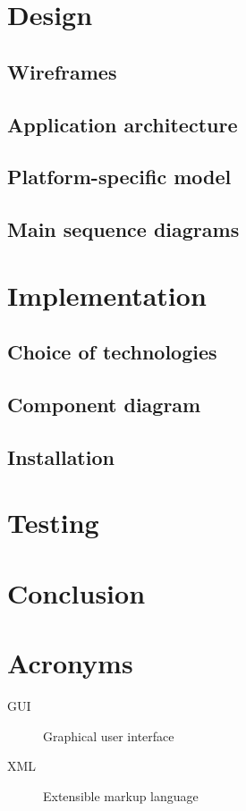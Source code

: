 \documentclass[thesis=B,english]{FITthesis}[2012/10/20]
\begin{document}
\newpage

\chapter{Design}
\section{Wireframes}
\section{Application architecture}
\section{Platform-specific model}
\section{Main sequence diagrams}

\chapter{Implementation}
\section{Choice of technologies}
\section{Component diagram}
\section{Installation}


\chapter{Testing}


\chapter{Conclusion}





\appendix

\chapter{Acronyms}
\begin{description}
	\item[GUI] Graphical user interface
	\item[XML] Extensible markup language
\end{description}
\end{document}
